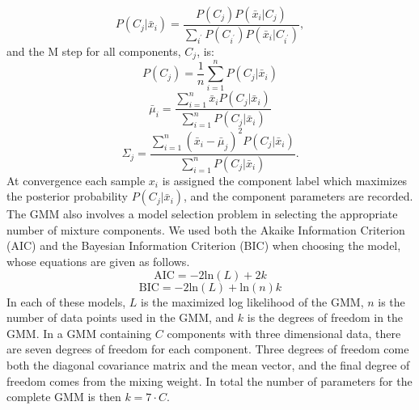 \documentclass{article}
\begin{document}
\begin{equation}
P(C_j|\bar{x}_i) = \frac{P(C_j)P(\bar{x}_i|C_j)}{\sum_{i^{'}}P(C_{i^{'}})P(\bar{x}_i|C_{i^{'}})},
\end{equation}
and the M step for all components, $C_j$, is:
\begin{equation}
P(C_j) = \frac{1}{n}\sum_{i=1}^nP(C_j|\bar{x}_i) 
\end{equation}
\begin{equation}
\bar{\mu}_i = \frac{\sum_{i=1}^n\bar{x}_iP(C_j|\bar{x}_i)}{\sum_{i=1}^n P(C_j|\bar{x}_i)} 
\end{equation}
\begin{equation}
\Sigma_j = \frac{\sum_{i=1}^n(\bar{x}_i - 
\bar{\mu}_j)^2P(C_j|\bar{x}_i)}{\sum_{i=1}^n P(C_j|\bar{x}_i)}.
\end{equation}
At convergence each sample $x_i$ is assigned the component label which maximizes the posterior probability $P(C_j|\bar{x}_i)$, and the component parameters are recorded. 
\newline
\indent
The GMM also involves a model selection problem in selecting the appropriate number of mixture components. We used both the Akaike Information Criterion (AIC) and the Bayesian Information Criterion (BIC) when choosing the model, whose equations are given as follows.
\begin{equation}
\text{AIC} = -2\text{ln}(L) + 2k
\end{equation}
\begin{equation}
\text{BIC} = -2\text{ln}(L) + \text{ln}(n)k
\end{equation}
In each of these models, $L$ is the maximized log likelihood of the GMM, $n$ is the number of data points used in the GMM, and $k$ is the degrees of freedom in the GMM. In a GMM containing $C$ components with three dimensional data, there are seven degrees of freedom for each component. Three degrees of freedom come both the diagonal covariance matrix and the mean vector, and the final degree of freedom comes from the mixing weight. In total the number of parameters for the complete GMM is then $k = 7 \cdot C$.
\end{document}
